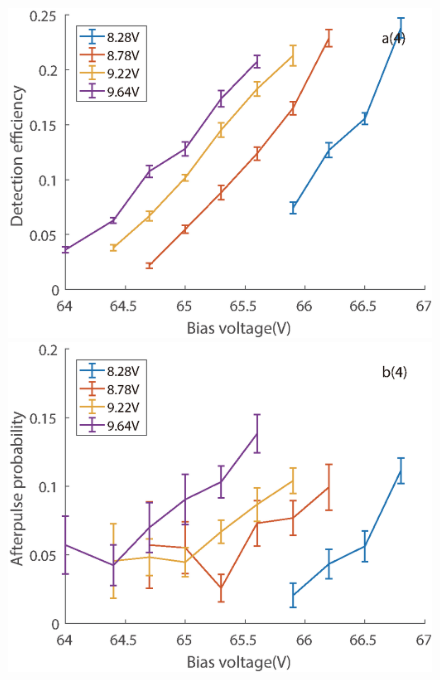 \documentclass[%
 reprint,
superscriptaddress,
 amsmath,amssymb,
 aps,
]{revtex4-1}
\begin{document}
\begin{figure}
\begin{minipage}{0.24\linewidth}
\centering
\includegraphics[width = 1\textwidth]{figure/105M/efficiency.eps}%
\end{minipage}
\begin{minipage}{0.24\linewidth}
\centering
\includegraphics[width = 1\textwidth]{figure/105M/afterpulse0.eps}%
\end{minipage}
\begin{minipage}{0.24\linewidth}
\centering

\end{minipage}
\end{figure}
\end{document}
